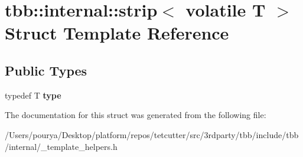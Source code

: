 \hypertarget{structtbb_1_1internal_1_1strip_3_01volatile_01T_01_4}{}\section{tbb\+:\+:internal\+:\+:strip$<$ volatile T $>$ Struct Template Reference}
\label{structtbb_1_1internal_1_1strip_3_01volatile_01T_01_4}
\subsection*{Public Types}
\begin{DoxyCompactItemize}
\item 
\hypertarget{structtbb_1_1internal_1_1strip_3_01volatile_01T_01_4_a82757bf3124d06d360bf68dc7b660f9a}{}typedef T {\bfseries type}\label{structtbb_1_1internal_1_1strip_3_01volatile_01T_01_4_a82757bf3124d06d360bf68dc7b660f9a}

\end{DoxyCompactItemize}


The documentation for this struct was generated from the following file\+:\begin{DoxyCompactItemize}
\item 
/\+Users/pourya/\+Desktop/platform/repos/tetcutter/src/3rdparty/tbb/include/tbb/internal/\+\_\+template\+\_\+helpers.\+h\end{DoxyCompactItemize}
